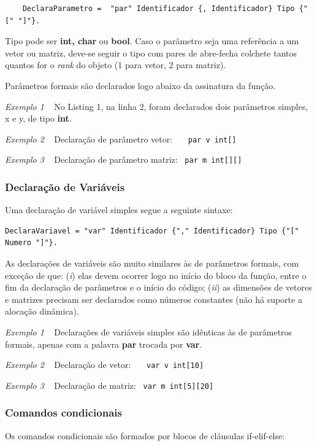 \documentclass[a4paper,12pt]{report}
\begin{document}
    \begin{verbatim}
    DeclaraParametro =  "par" Identificador {, Identificador} Tipo {"[" "]"}. \end{verbatim}
    Tipo pode ser \textbf{int, char} ou \textbf{bool}. Caso o parâmetro seja uma referência a um vetor ou matriz, deve-se seguir o tipo com pares de abre-fecha colchete tantos quantos for o \textit{rank} do objeto (1 para vetor, 2 para matriz).

    Parâmetros formais são declarados logo abaixo da assinatura da função.
    
    \textit{Exemplo 1} ~
     No Listing 1, na linha 2, foram declarados dois parâmetros simples, x e y, de tipo \textbf{int}.

    \textit{Exemplo 2} ~
     Declaração de parâmetro vetor: ~~~\verb|par v int[]|
    
    \textit{Exemplo 3} ~
     Declaração de parâmetro matriz: ~\verb|par m int[][]|

    \subsubsection*{Declaração de Variáveis}
    Uma declaração de variável simples segue a seguinte sintaxe:
    \begin{verbatim}
DeclaraVariavel = "var" Identificador {"," Identificador} Tipo {"[" Numero "]"}. \end{verbatim}
    As declarações de variáveis são muito similares às de parâmetros formais, com exceção de que: (\textit{i}) elas devem ocorrer logo no início do bloco da função, entre o fim da declaração de parâmetros e o início do código; (\textit{ii}) as dimensões de vetores e matrizes precisam ser declarados como números constantes (não há suporte a alocação dinâmica).
    
    \textit{Exemplo 1} ~
     Declarações de variáveis simples são idênticas às de parâmetros formais, apenas com a palavra \textbf{par} trocada por \textbf{var}.

    \textit{Exemplo 2} ~
     Declaração de vetor: ~~~\verb|var v int[10]|
    
    \textit{Exemplo 3} ~
     Declaração de matriz: ~\verb|var m int[5][20]|


    \subsubsection*{Comandos condicionais}
    Os comandos condicionais são formados por blocos de cláusulas if-elif-else:
\end{document}

